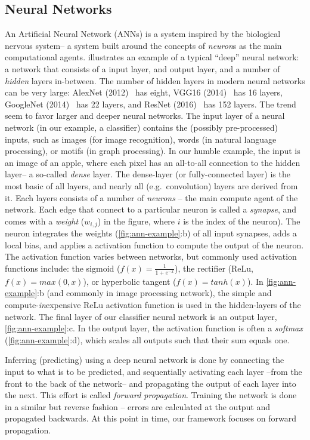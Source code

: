 \documentclass[techrep,english]{ipsj} %
\begin{document}
\subsection{Neural Networks}
An Artificial Neural Network (ANNs) is a system inspired by the biological nervous system-- a system built around the concepts of \textit{neuron}s as the main computational agents.
 illustrates an example of a typical “deep” neural network: a network that consists of a input layer, and output layer, and a number of \textit{hidden} layers in-between.
The number of hidden layers in modern neural networks can be very large: AlexNet (2012)~\cite{krizhevsky2012imagenet} has eight, VGG16 (2014)~\cite{simonyan2014very} has 16 layers, GoogleNet (2014)~\cite{szegedy2015going} has 22 layers, and ResNet (2016)~\cite{he2016deep} has 152 layers.
The trend seem to favor larger and deeper neural networks.
The input layer of a neural network (in our example, a classifier) contains the (possibly pre-processed) inputs, such as images (for image recognition), words (in natural language processing), or motifs (in graph processing).
In our humble example, the input is an image of an apple, where each pixel has an all-to-all connection to the hidden layer-- a so-called \textit{dense} layer. The dense-layer (or fully-connected layer) is the most basic of all layers, and nearly all (e.g.\ convolution) layers are derived from it.
Each layers consists of a number of \textit{neurons} – the main compute agent of the network.
Each edge that connect to a particular neuron is called a \textit{synapse}, and comes with a \textit{weight} (\(w_{i,j}\)) in the figure, where \(i\) is the index of the neuron).
The neuron integrates the weights (\cref{fig:ann-example}:b) of all input synapses, adds a local bias, and applies a activation function to compute the output of the neuron. The activation function varies between networks, but commonly used activation functions include: the sigmoid (\(f(x) = \frac{1}{1+e^{-x}}\)), the rectifier (ReLu, \(f(x) = max(0,x)\)), or hyperbolic tangent (\(f(x) = tanh(x)\)).
In \cref{fig:ann-example}:b (and commonly in image processing network), the simple and compute-\textit{in}expensive ReLu activation function is used in the hidden-layers of the network. The final layer of our classifier neural network is an output layer, \cref{fig:ann-example}:c. In the output layer, the activation function is often a \textit{softmax} (\cref{fig:ann-example}:d), which scales all outputs such that their sum equals one.

Inferring (predicting) using a deep neural network is done by connecting the input to what is to be predicted, and sequentially activating each layer --from the front to the back of the network-- and propagating the output of each layer into the next.
This effort is called \textit{forward propagation}. Training the network is done in a similar but reverse fashion -- errors are calculated at the output and propagated backwards.
At this point in time, our framework focuses on forward propagation.
\end{document}
